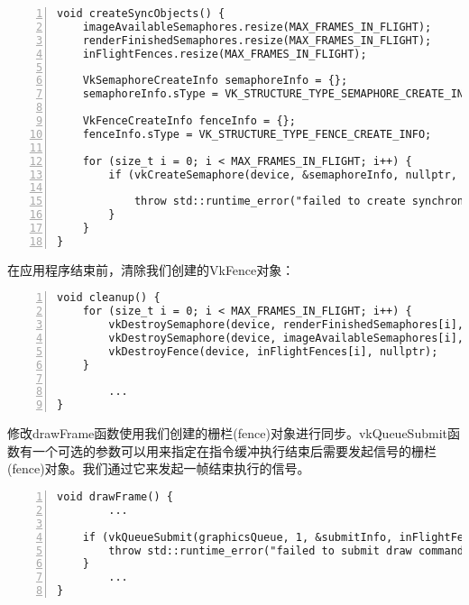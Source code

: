 \documentclass{ctexart}
\begin{document}
\begin{lstlisting}[language={[ANSI]C},keywordstyle=\color{blue!70},commentstyle=\color{red!50!green!50!blue!50},frame=shadowbox, rulesepcolor=\color{red!20!green!20!blue!20},basicstyle=\small,numbers=left, numberstyle=\tiny,breaklines=true]
void createSyncObjects() {
	imageAvailableSemaphores.resize(MAX_FRAMES_IN_FLIGHT);
	renderFinishedSemaphores.resize(MAX_FRAMES_IN_FLIGHT);
	inFlightFences.resize(MAX_FRAMES_IN_FLIGHT);

	VkSemaphoreCreateInfo semaphoreInfo = {};
	semaphoreInfo.sType = VK_STRUCTURE_TYPE_SEMAPHORE_CREATE_INFO;

	VkFenceCreateInfo fenceInfo = {};
	fenceInfo.sType = VK_STRUCTURE_TYPE_FENCE_CREATE_INFO;

	for (size_t i = 0; i < MAX_FRAMES_IN_FLIGHT; i++) {
		if (vkCreateSemaphore(device, &semaphoreInfo, nullptr, &imageAvailableSemaphores[i]) != VK_SUCCESS || vkCreateSemaphore(device, &semaphoreInfo, nullptr, &renderFinishedSemaphores[i]) != VK_SUCCESS || vkCreateFence(device, &fenceInfo, nullptr, &inFlightFences[i]) != VK_SUCCESS) {

			throw std::runtime_error("failed to create synchronization objects for a frame!");
		}
	}
}
\end{lstlisting}

在应用程序结束前，清除我们创建的VkFence对象：

\begin{lstlisting}[language={[ANSI]C},keywordstyle=\color{blue!70},commentstyle=\color{red!50!green!50!blue!50},frame=shadowbox, rulesepcolor=\color{red!20!green!20!blue!20},basicstyle=\small,numbers=left, numberstyle=\tiny,breaklines=true]
void cleanup() {
	for (size_t i = 0; i < MAX_FRAMES_IN_FLIGHT; i++) {
		vkDestroySemaphore(device, renderFinishedSemaphores[i], nullptr);
		vkDestroySemaphore(device, imageAvailableSemaphores[i], nullptr);
		vkDestroyFence(device, inFlightFences[i], nullptr);
	}

		...
}
\end{lstlisting}

修改drawFrame函数使用我们创建的栅栏(fence)对象进行同步。vkQueueSubmit函数有一个可选的参数可以用来指定在指令缓冲执行结束后需要发起信号的栅栏(fence)对象。我们通过它来发起一帧结束执行的信号。

\begin{lstlisting}[language={[ANSI]C},keywordstyle=\color{blue!70},commentstyle=\color{red!50!green!50!blue!50},frame=shadowbox, rulesepcolor=\color{red!20!green!20!blue!20},basicstyle=\small,numbers=left, numberstyle=\tiny,breaklines=true]
void drawFrame() {
		...

	if (vkQueueSubmit(graphicsQueue, 1, &submitInfo, inFlightFences[currentFrame]) != VK_SUCCESS) {
		throw std::runtime_error("failed to submit draw command buffer!");
	}
		...
}
\end{lstlisting}
\end{document}
